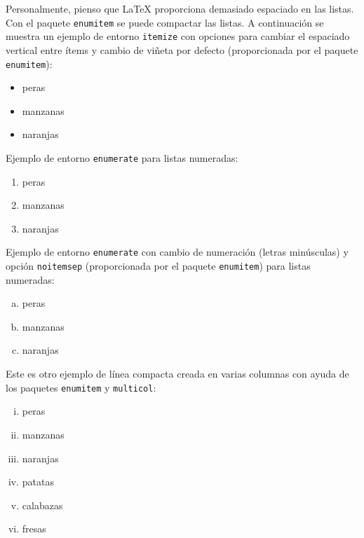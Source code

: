 \documentclass[ 		%
	11pt,				%
	a4paper,			%
	twoside,			%
	openright,			%
	final       		%
]{book}
\begin{document}
Personalmente, pienso que \LaTeX{} proporciona demasiado espaciado en las listas. Con el paquete \texttt{enumitem} se puede compactar las listas. A continuación se muestra un ejemplo de entorno {\tt itemize} con opciones para cambiar el espaciado vertical entre ítems y cambio de viñeta por defecto (proporcionada por el paquete \texttt{enumitem}):

\begin{itemize}[noitemsep]
	\item peras
	\item manzanas
	\item naranjas
\end{itemize}

\noindent Ejemplo de entorno {\tt enumerate} para listas numeradas:

\begin{enumerate}
	\item peras
	\item manzanas
	\item naranjas
\end{enumerate}


\noindent Ejemplo de entorno {\tt enumerate} con cambio de numeración (letras minúsculas) y opción \texttt{noitemsep} (proporcionada por el paquete \texttt{enumitem}) para listas numeradas:

\begin{enumerate}[a.-,noitemsep]
	\item peras
	\item manzanas
	\item naranjas
\end{enumerate}

\noindent Este es otro ejemplo de línea compacta creada en varias columnas con ayuda de los paquetes \texttt{enumitem} y \texttt{multicol}:
\begin{multicols}{2} %
	\begin{enumerate}[i.,noitemsep]
		\item peras
		\item manzanas
		\item naranjas
		\item patatas
		\item calabazas
		\item fresas
	\end{enumerate}
\end{multicols}
\end{document}
